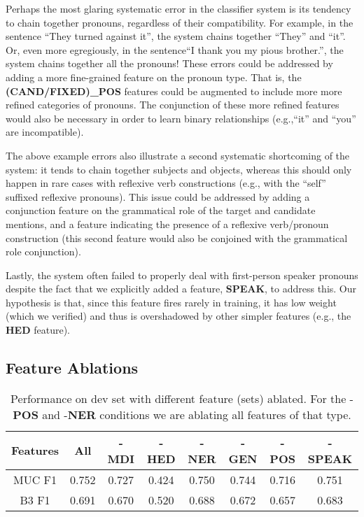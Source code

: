 \documentclass[12pt,a4paper]{article}
\begin{document}
Perhaps the most glaring systematic error in the classifier system is its tendency to chain together pronouns, regardless of their compatibility. 
For example, in the sentence ``They turned against it'', the system chains together ``They'' and ``it''.  
Or, even more egregiously, in the sentence``I thank you my pious brother.'', the system chains together all the pronouns! 
These errors could be addressed by adding a more fine-grained feature on the pronoun type. 
That is, the \textbf{(CAND/FIXED)\_POS} features could be augmented to include more more refined categories of pronouns. 
The conjunction of these more refined features would also be necessary in order to learn binary relationships (e.g.,``it'' and ``you'' are incompatible). 

The above example errors also illustrate a second systematic shortcoming of the system: it tends to chain together subjects and objects, whereas this should only happen in rare cases with reflexive verb constructions (e.g., with the ``self'' suffixed reflexive pronouns). 
This issue could be addressed by adding a conjunction feature on the grammatical role of the target and candidate mentions, and a feature indicating the presence of a reflexive verb/pronoun construction (this second feature would also be conjoined with the grammatical role conjunction).

Lastly, the system often failed to properly deal with first-person speaker pronouns despite the fact that we explicitly added a feature, \textbf{SPEAK},  to address this.
Our hypothesis is that, since this feature fires rarely in training, it has low weight (which we verified) and thus is overshadowed by other simpler features (e.g., the \textbf{HED} feature).

\subsection{Feature Ablations}

\begin{table}[h!]
\centering
\begin{tabular}{c||c|c|c|c|c|c|c|}
Features & All & -\textbf{MDI} & -\textbf{HED} &  -\textbf{NER} & -\textbf{GEN} & -\textbf{POS} & -\textbf{SPEAK}\\ 
\hline 
MUC F1& 0.752 & 0.727 & 0.424 &  0.750 & 0.744 & 0.716 & 0.751  \\ 
\hline 
B3 F1& 0.691 & 0.670 & 0.520 & 0.688 & 0.672 & 0.657 & 0.683\\ 
\hline 
\end{tabular} 
\caption{Performance on dev set with different feature (sets) ablated. For the -\textbf{POS} and -\textbf{NER} conditions we are ablating all features of that type.}
\end{table}
\end{document}
